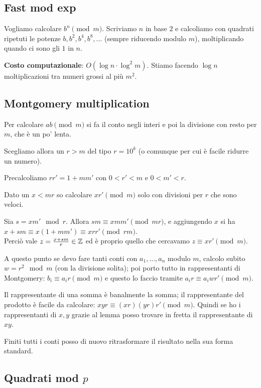 \documentclass[a4paper]{book}
\begin{document}
    \subsection{Fast mod exp}
    Vogliamo calcolare $b^n \pmod m$. Scriviamo $n$ in base $2$ e calcoliamo con quadrati ripetuti le potenze $b,b^2,b^4,b^8,\dots$ (sempre riducendo modulo $m$), moltiplicando quando ci sono gli $1$ in $n$.

    \textbf{Costo computazionale}: $O(\log n\cdot \log^2m)$. Stiamo facendo $\log n$ moltiplicazioni tra numeri grossi al più $m^2$.

    \subsection{Montgomery multiplication}
    Per calcolare $ab\pmod m$ si fa il conto negli interi e poi la divisione con resto per $m$, che è un po' lenta.

    Scegliamo allora un $r>m$ del tipo $r=10^k$ (o comunque per cui è facile ridurre un numero).

    Precalcoliamo $rr'=1+mm'$ con $0<r'<m$ e $0<m'<r$.

    \begin{lemma}
        Dato un $x<mr$ so calcolare $xr'\pmod m$ solo con divisioni per $r$ che sono veloci.
    \end{lemma}
    Sia $s=xm'\mod r$. Allora $sm\equiv xmm'\pmod{mr}$, e aggiungendo $x$ si ha $x+sm\equiv x(1+mm')\equiv xrr'\pmod{rm}$.\\
    Perciò vale $z=\frac{x+sm}{r}\in\mathbb{Z}$ ed è proprio quello che cercavamo $z\equiv xr'\pmod m$.

    \bigskip
    A questo punto se devo fare tanti conti con $a_1,\dots,a_n$ modulo $m$, calcolo subito $w=r^2\mod m$ (con la divisione solita); poi porto tutto in rappresentanti di Montgomery: $b_i\equiv a_ir\pmod m$ e questo lo faccio tramite $a_ir\equiv a_iwr'\pmod m$.

    Il rappresentante di una somma è banalmente la somma; il rappresentante del prodotto è facile da calcolare: $xyr\equiv(xr)(yr)r'\pmod m$. Quindi se ho i rappresentanti di $x,y$ grazie al lemma posso trovare in fretta il rappresentante di $xy$.

    Finiti tutti i conti posso di nuovo ritrasformare il risultato nella sua forma standard.

    \subsection{Quadrati mod $p$}
\end{document}
